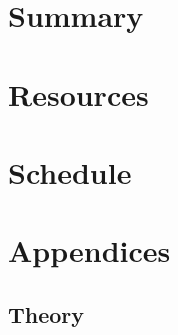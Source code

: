 \documentclass[12pt]{article}
\begin{document}
\section{Summary}


\section{Resources}


\section{Schedule}


\appendix
\section*{Appendices}
\renewcommand{\thesubsection}{\Alph{subsection}}

\subsection{Theory} \label{appendix:theory}

 

\end{document}
